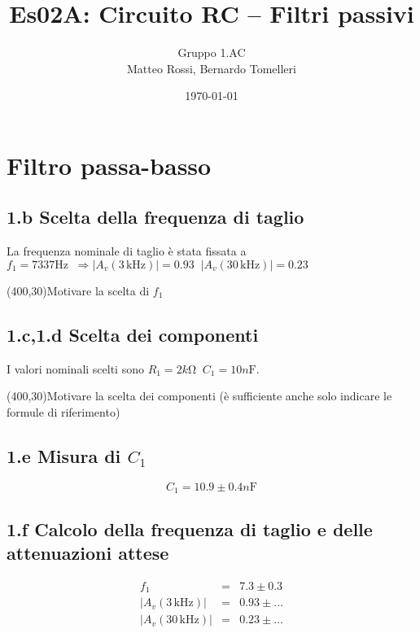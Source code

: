 \documentclass[10pt,a4paper]{article}
\author{Gruppo 1.AC \\ Matteo Rossi, Bernardo Tomelleri}
\title{Es02A: Circuito RC -- Filtri passivi}
\begin{document}
\date{\today}
\maketitle

\setcounter{section}{1}

\section*{Filtro passa-basso}

\subsection*{1.b Scelta della frequenza di taglio}

La frequenza nominale di taglio \`e stata fissata a $f_1 = 7337 \si{\Hz} \;\; \Rightarrow |A_v(3\,\mathrm{kHz})| = 0.93 \;\; |A_v(30\,\mathrm{kHz})| = 0.23$  

\vspace{0.5cm}
\framebox(400,30){Motivare la scelta di $f_1$}

\subsection*{1.c,1.d Scelta dei componenti}

I valori nominali scelti sono $R_1 = 2 \si{k\ohm} \;\; C_1 = 10 \si{n\F}$.  

\vspace{0.5cm}
\framebox(400,30){Motivare la scelta dei componenti (\`e sufficiente  anche solo indicare le formule di riferimento)}

\subsection*{1.e Misura di $C_1$}
\[
C_1 = 10.9 \pm 0.4 \si{n\F}
\]

\subsection*{1.f Calcolo della frequenza di taglio e delle attenuazioni attese}
\[
\begin{array}{rcl}
f_1 &=& 7.3 \pm 0.3\\
|A_v(3\,\mathrm{kHz})| &=& 0.93 \pm \ldots\\
|A_v(30\,\mathrm{kHz})| &=& 0.23 \pm \ldots
\end{array}
\]
\end{document}
